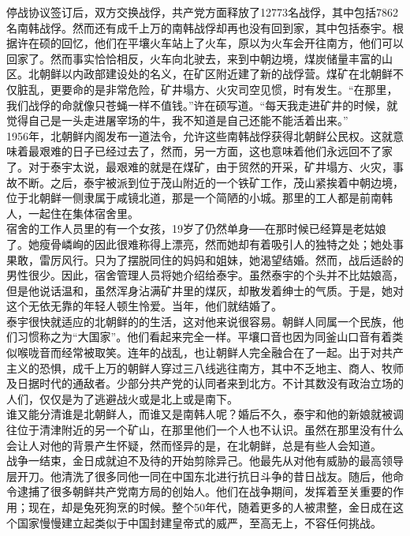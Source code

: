 \begin{multicols}{\theparacolNo}
停战协议签订后，双方交换战俘，共产党方面释放了12773名战俘，其中包括7862名南韩战俘。然而还有成千上万的南韩战俘却再也没有回到家，其中包括泰宇。根据许在硕的回忆，他们在平壤火车站上了火车，原以为火车会开往南方，他们可以回家了。然而事实恰恰相反，火车向北驶去，来到中朝边境，煤炭储量丰富的山区。北朝鲜以内政部建设处的名义，在矿区附近建了新的战俘营。煤矿在北朝鲜不仅脏乱，更要命的是非常危险，矿井塌方、火灾司空见惯，时有发生。“在那里，我们战俘的命就像只苍蝇一样不值钱。”许在硕写道。“每天我走进矿井的时候，就觉得自己是一头走进屠宰场的牛，我不知道是自己还能不能活着出来。”\\

1956年，北朝鲜内阁发布一道法令，允许这些南韩战俘获得北朝鲜公民权。这就意味着最艰难的日子已经过去了，然而，另一方面，这也意味着他们永远回不了家了。对于泰宇太说，最艰难的就是在煤矿，由于贸然的开采，矿井塌方、火灾，事故不断。之后，泰宇被派到位于茂山附近的一个铁矿工作，茂山紧挨着中朝边境，位于北朝鲜一侧隶属于咸镜北道，那是一个简陋的小城。那里的工人都是前南韩人，一起住在集体宿舍里。\\

宿舍的工作人员里的有一个女孩，19岁了仍然单身──在那时候已经算是老姑娘了。她瘦骨嶙峋的因此很难称得上漂亮，然而她却有着吸引人的独特之处；她处事果敢，雷厉风行。只为了摆脱同住的妈妈和姐妹，她渴望结婚。然而，战后适龄的男性很少。因此，宿舍管理人员将她介绍给泰宇。虽然泰宇的个头并不比姑娘高，但是他说话温和，虽然浑身沾满矿井里的煤灰，却散发着绅士的气质。于是，她对这个无依无靠的年轻人顿生怜爱。当年，他们就结婚了。\\

泰宇很快就适应的北朝鲜的的生活，这对他来说很容易。朝鲜人同属一个民族，他们习惯称之为“大国家”。他们看起来完全一样。平壤口音也因为同釜山口音有着类似喉咙音而经常被取笑。连年的战乱，也让朝鲜人完全融合在了一起。出于对共产主义的恐惧，成千上万的朝鲜人穿过三八线逃往南方，其中不乏地主、商人、牧师及日据时代的通敌者。少部分共产党的认同者来到北方。不计其数没有政治立场的人们，仅仅是为了逃避战火或是北上或是南下。\\

谁又能分清谁是北朝鲜人，而谁又是南韩人呢？婚后不久，泰宇和他的新娘就被调往位于清津附近的另一个矿山，在那里他们一个人也不认识。虽然在那里没有什么会让人对他的背景产生怀疑，然而怪异的是，在北朝鲜，总是有些人会知道。\\

战争一结束，金日成就迫不及待的开始剪除异己。他最先从对他有威胁的最高领导层开刀。他清洗了很多同他一同在中国东北进行抗日斗争的昔日战友。随后，他命令逮捕了很多朝鲜共产党南方局的创始人。他们在战争期间，发挥着至关重要的作用；现在，却是兔死狗烹的时候。整个50年代，随着更多的人被肃整，金日成在这个国家慢慢建立起类似于中国封建皇帝式的威严，至高无上，不容任何挑战。\\


\end{multicols}
